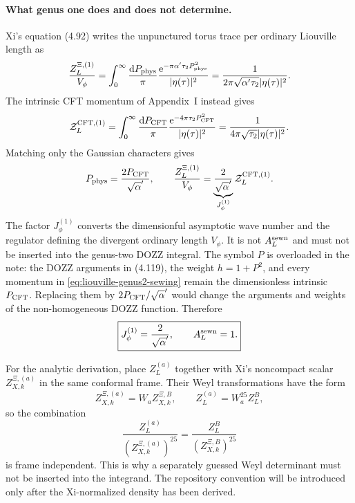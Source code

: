 \documentclass[11pt]{article}
\numberwithin{equation}{section}
\newcommand{\A}{\alpha'}
\newcommand{\dd}{\mathrm d}
\newcommand{\ee}{\mathrm e}
\newcommand{\cZ}{\mathcal Z}
\begin{document}
\paragraph{What genus one does and does not determine.}
Xi's equation (4.92) writes the unpunctured torus trace per ordinary
Liouville length as
\begin{equation}
 \frac{Z_L^{\Xi,(1)}}{V_\phi}
 =\int_0^\infty\frac{\dd P_{\rm phys}}{\pi}
 \frac{\ee^{-\pi\A\tau_2P_{\rm phys}^2}}{|\eta(\tau)|^2}
 =\frac1{2\pi\sqrt{\A\tau_2}|\eta(\tau)|^2}.
 \label{eq:Xi-Liouville-torus-volume-density}
\end{equation}
The intrinsic CFT momentum of Appendix~I instead gives
\begin{equation}
 \cZ_L^{\rm CFT,(1)}
 =\int_0^\infty\frac{\dd P_{\rm CFT}}{\pi}
 \frac{\ee^{-4\pi\tau_2P_{\rm CFT}^2}}{|\eta(\tau)|^2}
 =\frac1{4\pi\sqrt{\tau_2}|\eta(\tau)|^2}.
 \label{eq:CFT-Liouville-torus-density}
\end{equation}
Matching only the Gaussian characters gives
\begin{equation}
 P_{\rm phys}=\frac{2P_{\rm CFT}}{\sqrt\A},
 \qquad
 \frac{Z_L^{\Xi,(1)}}{V_\phi}
 =\underbrace{\frac2{\sqrt\A}}_{J_\phi^{(1)}}
 \cZ_L^{\rm CFT,(1)}.
 \label{eq:Jphi-genus-one}
\end{equation}
The factor $J_\phi^{(1)}$ converts the dimensionful asymptotic wave number
and the regulator defining the divergent ordinary length $V_\phi$.  It is
not $A_L^{\rm sewn}$ and must not be inserted into the genus-two DOZZ
integral.  The symbol $P$ is overloaded in the note: the DOZZ arguments in
(4.119), the weight $h=1+P^2$, and every momentum in
\eqref{eq:liouville-genus2-sewing} remain the dimensionless intrinsic
$P_{\rm CFT}$.  Replacing them by $2P_{\rm CFT}/\sqrt\A$ would change the
arguments and weights of the non-homogeneous DOZZ function.  Therefore
\begin{equation}
 \boxed{J_\phi^{(1)}=\frac2{\sqrt\A},
 \qquad A_L^{\rm sewn}=1.}
 \label{eq:AL-final-verdict}
\end{equation}

For the analytic derivation, place $Z_L^{(a)}$ together with Xi's noncompact
scalar $Z_{X,k}^{\Xi,(a)}$ in the same conformal frame.  Their Weyl
transformations have
the form
\begin{equation}
 Z_{X,k}^{\Xi,(a)}=W_a Z_{X,k}^{\Xi,B},
 \qquad
 Z_L^{(a)}=W_a^{25}Z_L^{B},
\end{equation}
so the combination
\begin{equation}
 \frac{Z_L^{(a)}}{(Z_{X,k}^{\Xi,(a)})^{25}}
 =\frac{Z_L^{B}}{(Z_{X,k}^{\Xi,B})^{25}}
 \label{eq:same-frame-quotient}
\end{equation}
is frame independent.  This is why a separately guessed Weyl determinant
must not be inserted into the integrand.  The repository convention will be
introduced only after the Xi-normalized density has been derived.
\end{document}
